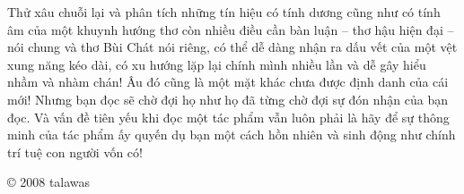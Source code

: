\documentclass[../main.tex]{subfiles}
\begin{document}
\begin{multicols}{2}
\begin{blockquote}
\end{blockquote}


Thử xâu chuỗi lại và phân tích những tín hiệu có tính dương cũng như có tính âm của một khuynh hướng thơ còn nhiều điều cần bàn luận – thơ hậu hiện đại – nói chung và thơ Bùi Chát nói riêng, có thể dễ dàng nhận ra dấu vết của một vệt xung năng kéo dài, có xu hướng lặp lại chính mình nhiều lần và dễ gây hiểu nhầm và nhàm chán! Âu đó cũng là một mặt khác chưa được định danh của cái mới! Nhưng bạn đọc sẽ chờ đợi họ như họ đã từng chờ đợi sự đón nhận của bạn đọc. Và vấn đề tiên yếu khi đọc một tác phẩm vẫn luôn phải là hãy để sự thông minh của tác phẩm ấy quyến dụ bạn một cách hồn nhiên và sinh động như chính trí tuệ con người vốn có! 

© 2008 talawas 
\end{multicols}
\end{document}
